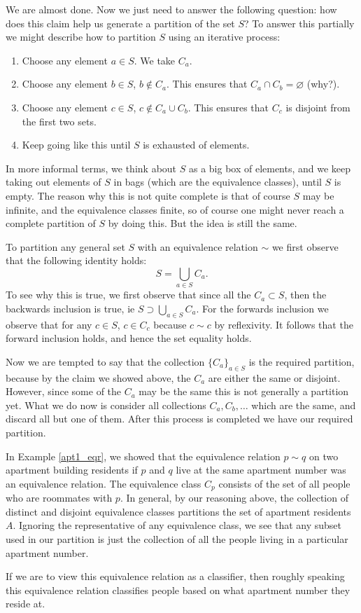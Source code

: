 We are almost done. Now we just need to answer the following question: how does this claim help us generate a partition of the set $S$? To answer this partially we might describe how to partition $S$ using an iterative process:
\begin{enumerate}
	\item Choose any element $a \in S$. We take $C_a$.
	\item Choose any element $b \in S$, $b \not\in C_a$. This ensures that $C_a \cap C_b = \varnothing$ (why?). 
	\item Choose any element $c \in S$, $c \not\in C_a \cup C_b$. This ensures that $C_c$ is disjoint from the first two sets. 
	\item Keep going like this until $S$ is exhausted of elements.
\end{enumerate}
In more informal terms, we think about $S$ as a big box of elements, and we keep taking out elements of $S$ in bags (which are the equivalence classes), until $S$ is empty. The reason why this is not quite complete is that of course $S$ may be infinite, and the equivalence classes finite, so of course one might never reach a complete partition of $S$ by doing this. But the idea is still the same.

To partition any general set $S$ with an equivalence relation $\sim$ we first observe that the following identity holds:
\[S = \bigcup_{a \in S}C_a.\]
To see why this is true, we first observe that since all the $C_a \subset S$, then the backwards inclusion is true, ie $S \supset \bigcup_{a \in S}C_a$. For the forwards inclusion we observe that for any $c \in S$, $c \in C_c$ because $c \sim c$ by reflexivity. It follows that the forward inclusion holds, and hence the set equality holds.

Now we are tempted to say that the collection $\{C_a\}_{a \in S}$ is the required partition, because by the claim we showed above, the $C_a$ are either the same or disjoint. However, since some of the $C_a$ may be the same this is not generally a partition yet. What we do now is consider all collections $C_a, C_b, \dots$ which are the same, and discard all but one of them. After this process is completed we have our required partition.

\begin{example}\label{apt2_eqr}
In Example \ref{apt1_eqr}, we showed that the equivalence relation $p \sim q$ on two apartment building residents if $p$ and $q$ live at the same apartment number was an equivalence relation. The equivalence class $C_p$ consists of the set of all people who are roommates with $p$. In general, by our reasoning above, the collection of distinct and disjoint equivalence classes partitions the set of apartment residents $A$. Ignoring the representative of any equivalence class, we see that any subset used in our partition is just the collection of all the people living in a particular apartment number. 

If we are to view this equivalence relation as a classifier, then roughly speaking this equivalence relation classifies people based on what apartment number they reside at. 
\end{example}

